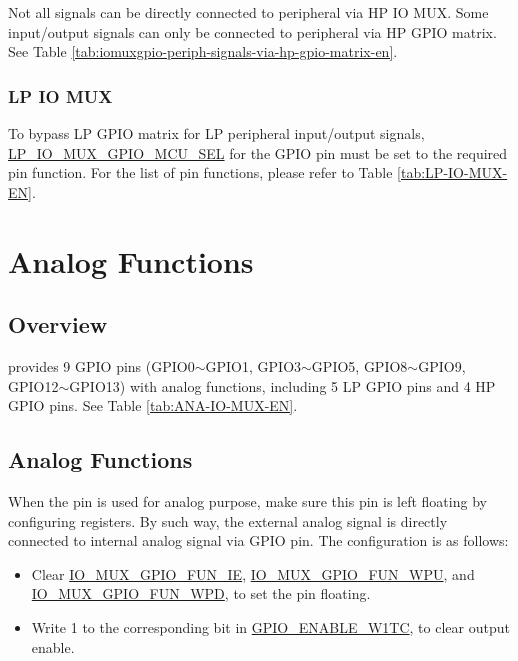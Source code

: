 \documentclass[main\_\_EN.tex]{subfiles}
\begin{document}
\begin{tiplisting}
Not all signals can be directly connected to peripheral via HP IO MUX. Some input/output signals can only be connected to peripheral via HP GPIO matrix. See Table \ref{tab:iomuxgpio-periph-signals-via-hp-gpio-matrix-en}.
\end{tiplisting}

\subsubsection{LP IO MUX}

To bypass LP GPIO matrix for LP peripheral input/output signals, \hyperref[fielddesc:LPIOMUXGPIONMCUSEL] {LP\_IO\_MUX\_GPIO\_MCU\_SEL} for the GPIO pin must be set to the required pin function. For the list of pin functions, please refer to Table \ref{tab:LP-IO-MUX-EN}.

\section{Analog Functions}

\subsection{Overview}
\chipname{} provides 9 GPIO pins (GPIO0$\sim$GPIO1, GPIO3$\sim$GPIO5, GPIO8$\sim$GPIO9, GPIO12$\sim$GPIO13) with analog functions, including 5 LP GPIO pins and 4 HP GPIO pins. See Table \ref{tab:ANA-IO-MUX-EN}.

\subsection{Analog Functions}
When the pin is used for analog purpose, make sure this pin is left floating by configuring registers. By such way, the external analog signal is directly connected to internal analog signal via GPIO pin. The configuration is as follows:

\begin{itemize}
    \item Clear \hyperref[fielddesc:IOMUXGPIONFUNIE]{IO\_MUX\_GPIO\_FUN\_IE}, \hyperref[fielddesc:IOMUXGPIONFUNWPU]{IO\_MUX\_GPIO\_FUN\_WPU}, and \hyperref[fielddesc:IOMUXGPIONFUNWPD]{IO\_MUX\_GPIO\_FUN\_WPD}, to set the pin floating.
    \item Write 1 to the corresponding bit in  \hyperref[regdesc:GPIOENABLEW1TCREG]{GPIO\_ENABLE\_W1TC}, to clear output enable.
\end{itemize}
\end{document}
